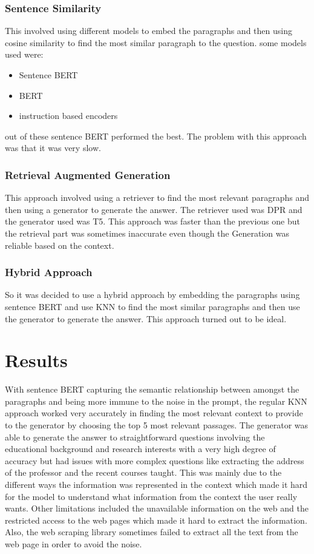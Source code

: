 \documentclass{article}
\begin{document}
\subsubsection{Sentence Similarity}
This involved using different models to embed the paragraphs and then using cosine similarity to find the most similar paragraph to the question. some models used were:

\begin{itemize}
    \item Sentence BERT
    \item BERT
    \item instruction based encoders
\end{itemize}

out of these sentence BERT performed the best. The problem with this approach was that it was very slow.

\subsubsection{Retrieval Augmented Generation}
This approach involved using a retriever to find the most relevant paragraphs and then using a generator to generate the answer. The retriever used was DPR and the generator used was T5. This approach was faster than the previous one but the retrieval part was sometimes inaccurate even though the Generation was reliable based on the context.

\subsubsection{Hybrid Approach}
So it was decided to use a hybrid approach by embedding the paragraphs using sentence BERT and use KNN to find the most similar paragraphs and then use the generator to generate the answer. This approach turned out to be ideal.

\section{Results}

With sentence BERT capturing the semantic relationship between amongst the paragraphs and being more immune to the noise in the prompt, the regular KNN approach worked very accurately in finding the most relevant context to provide to the generator by choosing the top 5 most relevant passages. The generator was able to generate the answer to straightforward questions involving the educational background and research interests with a very high degree of accuracy but had issues with more complex questions like extracting the address of the professor and the recent courses taught. This was mainly due to the different ways the information was represented in the context which made it hard for the model to understand what information from the context the user really wants. Other limitations included the unavailable information on the web and the restricted access to the web pages which made it hard to extract the information. Also, the web scraping library sometimes failed to extract all the text from the web page in order to avoid the noise.
\end{document}
